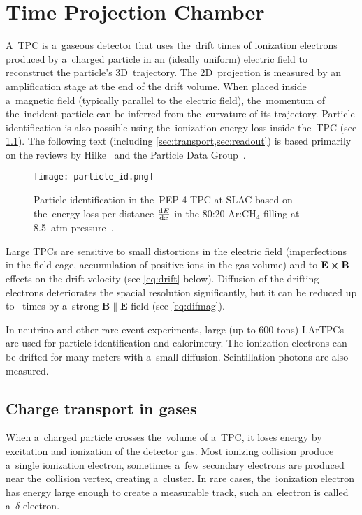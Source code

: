 \chapter{Time Projection Chamber}
\label{sec:tpc}
	A~\acf{TPC} is a~gaseous detector that uses the~drift times of ionization electrons produced by a~charged particle in an (ideally uniform) electric field to reconstruct the particle's 3D~trajectory. The 2D~projection is measured by an amplification stage at the end of the drift volume. When placed inside a~magnetic field (typically parallel to the electric field), the~momentum of the~incident particle can be inferred from the~curvature of its trajectory. Particle identification is also possible using the~ionization energy loss inside the~\ac{TPC} (see \cref{fig:particleid}). The following text (including \cref{sec:transport,sec:readout}) is based primarily on the reviews by Hilke~\cite{TPCs} and the Particle Data Group~\cite{pdg2024}.
	
	\begin{figure}[H]
		\centering
		\texttt{[image: particle\_id.png]}
		\caption{Particle identification in the~PEP-4 \ac{TPC} at SLAC based on the~energy loss per distance $\dv{E}{x}$ in the 80:20 Ar:CH$_4$ filling at \qty{8.5}{atm} pressure~\cite{particleid}.}
		\label{fig:particleid}
	\end{figure}
	
	Large \acp{TPC} are sensitive to small distortions in the electric field (imperfections in the field cage, accumulation of positive ions in the gas volume) and to $\mathbf{E}\cross\mathbf{B}$ effects on the drift velocity (see \cref{eq:drift} below). Diffusion of the drifting electrons deteriorates the spacial resolution significantly, but it can be reduced up to ~times by a~strong $\mathbf{B}\parallel\mathbf{E}$ field (see \cref{eq:difmag}).
	
	In neutrino and other rare-event experiments, large (up to 600 tons) \acp{LArTPC} are used for particle identification and calorimetry. The ionization electrons can be drifted for many meters with a~small diffusion. Scintillation photons are also measured.
	
	\section{Charge transport in gases}
	\label{sec:transport}
		When a~charged particle crosses the~volume of a~\ac{TPC}, it loses energy by excitation and ionization of the detector gas. Most ionizing collision produce a~single ionization electron, sometimes a~few secondary electrons are produced near the~collision vertex, creating a~cluster. In rare cases, the~ionization electron has energy large enough to create a measurable track, such an~electron is called a~$\delta$\nobreakdash-electron.
		
